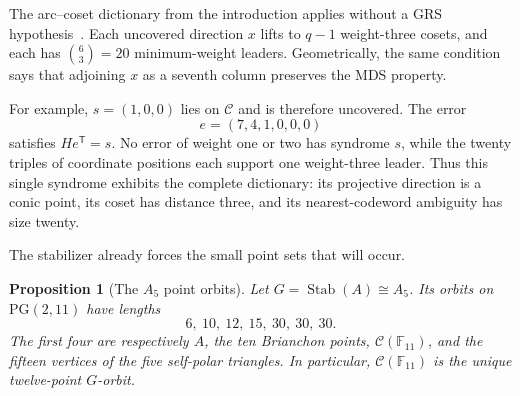 \documentclass[11pt]{article}
\newtheorem{proposition}[theorem]{Proposition}
\theoremstyle{definition}
\theoremstyle{remark}
\newcommand{\PG}{\mathrm{PG}}
\newcommand{\F}{\mathbb{F}}
\newcommand{\cC}{\mathcal{C}}
\begin{document}
The arc--coset dictionary from the introduction applies without a GRS
hypothesis~\cite[Def.~6.1, Thm.~6.3]{DMP2021}. Each uncovered direction
$x$ lifts to $q-1$ weight-three cosets, and each has
$\binom{6}{3}=20$ minimum-weight leaders. Geometrically, the same condition says
that adjoining $x$ as a seventh column preserves the MDS property.

For example, $s=(1,0,0)$ lies on $\cC$ and is therefore uncovered.
The error
\[
 e=(7,4,1,0,0,0)
\]
satisfies $He^{\mathsf T}=s$.  No error of weight one or two has syndrome
$s$, while the twenty triples of coordinate positions each support one
weight-three leader.  Thus this single syndrome exhibits the complete
dictionary: its projective direction is a conic point, its coset has
distance three, and its nearest-codeword ambiguity has size twenty.

The stabilizer already forces the small point sets that will occur.

\begin{proposition}[The $A_5$ point orbits]
\label{prop:a5-point-orbits}
Let $G=\operatorname{Stab}(A)\cong A_5$. Its orbits on $\PG(2,11)$ have
lengths
\[
 6,\ 10,\ 12,\ 15,\ 30,\ 30,\ 30.
\]
The first four are respectively $A$, the ten Brianchon points,
$\cC(\F_{11})$, and the fifteen vertices of the five self-polar triangles.
In particular, $\cC(\F_{11})$ is the unique twelve-point $G$-orbit.
\end{proposition}
\end{document}
